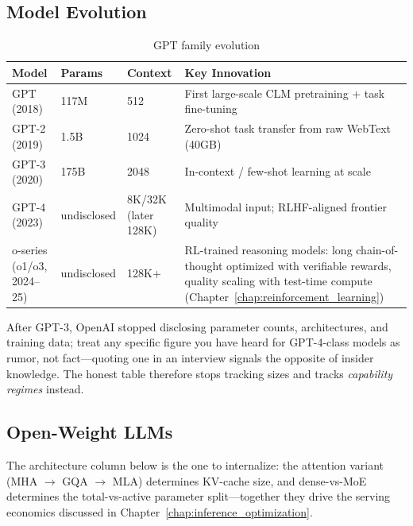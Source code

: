 \subsection{Model Evolution}

\begin{table}[H]
\centering
\caption{GPT family evolution}
\begin{tabularx}{\textwidth}{lllX}
\toprule
\textbf{Model} & \textbf{Params} & \textbf{Context} & \textbf{Key Innovation} \\
\midrule
GPT (2018) & 117M & 512 & First large-scale CLM pretraining + task fine-tuning \\
GPT-2 (2019) & 1.5B & 1024 & Zero-shot task transfer from raw WebText (40GB) \\
GPT-3 (2020) & 175B & 2048 & In-context / few-shot learning at scale \\
GPT-4 (2023) & undisclosed & 8K/32K (later 128K) & Multimodal input; RLHF-aligned frontier quality \\
o-series (o1/o3, 2024--25) & undisclosed & 128K+ & RL-trained reasoning models: long chain-of-thought optimized with verifiable rewards, quality scaling with test-time compute (Chapter~\ref{chap:reinforcement_learning}) \\
\bottomrule
\end{tabularx}
\end{table}

After GPT-3, OpenAI stopped disclosing parameter counts, architectures, and training data; treat any specific figure you have heard for GPT-4-class models as rumor, not fact---quoting one in an interview signals the opposite of insider knowledge. The honest table therefore stops tracking sizes and tracks \emph{capability regimes} instead.

\subsection{Open-Weight LLMs}

The architecture column below is the one to internalize: the attention variant (MHA $\to$ GQA $\to$ MLA) determines KV-cache size, and dense-vs-MoE determines the total-vs-active parameter split---together they drive the serving economics discussed in Chapter~\ref{chap:inference_optimization}.


